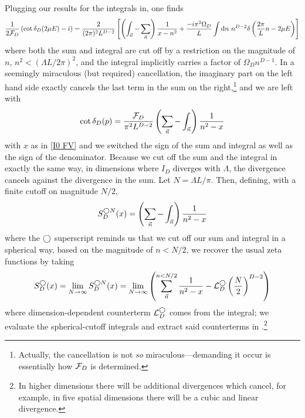 Plugging our results for the integrals in, one finds
\begin{equation}
    \frac{1}{2\mathcal{F}_{D}}\left(\cot \delta_{D}(2\mu E) - i\right) = \frac{2}{(2\pi)^2 L^{D-2}}\left[ \left(\int_{\vec{n}} - \sum_{\vec{n}}\right) \frac{1}{x-n^2} + \frac{-i \pi^2\Omega_D}{L} \int \mathrm{d}n\ n^{D-2} \delta\left(\frac{2\pi}{L}n - 2\mu E\right) \right]
\end{equation}
where both the sum and integral are cut off by a restriction on the magnitude of $n$, $n^2 < (\Lambda L / 2\pi)^2$, and the integral implicitly carries a factor of $\Omega_D n^{D-1}$.
In a seemingly miraculous (but required) cancellation, the imaginary part on the left hand side exactly cancels the last term in the sum on the right,\footnote{Actually, the cancellation is not \emph{so} miraculous---demanding it occur is essentially how $\mathcal{F}_D$ is determined.} and we are left with
\begin{equation}
    \cot \delta_{D}(p) = \frac{\mathcal{F}_{D}}{\pi^2 L^{D-2}} \left(\sum_{\vec{n}}-\int_{\vec{n}}\right) \frac{1}{n^2-x}
\end{equation}
with $x$ as in \eqref{I0 FV} and we switched the sign of the sum and integral as well as the sign of the denominator.
Because we cut off the sum and the integral in exactly the same way, in dimensions where $I_D$ diverges with $\Lambda$, the divergence cancels against the divergence in the sum.
Let $N=\Lambda L/\pi$.
Then, defining, with a finite cutoff on magnitude $N/2$,
\begin{equation}\label{eq:spherical cutoff S}
    S^{\bigcirc N}_D(x) = \left(\sum_{\vec{n}}- \int_{\vec{n}}\right) \frac{1}{n^2-x}
\end{equation}
where the $\bigcirc$ superscript reminds us that we cut off our sum and integral in a spherical way, based on the magnitude of $n<N/2$, we recover the usual \Luscher zeta functions by taking
\begin{equation}\label{eq:spherical S}
    S^\bigcirc_D(x)
    =
    \lim_{N\rightarrow\infty} S^{\bigcirc N}_D(x)
    =
    \lim_{N\rightarrow\infty}\left( \sum_{\vec{n}}^{n < N/2} \frac{1}{n^2-x} - \mathcal{L}_D^\bigcirc \left(\frac{N}{2}\right)^{D-2}\right)
\end{equation}
where dimension-dependent counterterm $\mathcal{L}_D^\bigcirc$ comes from the integral; we evaluate the spherical-cutoff integrals and extract said counterterms in .\footnote{
In higher dimensions there will be additional divergences which cancel, for example, in five spatial dimensions there will be a cubic and linear divergence.
}
